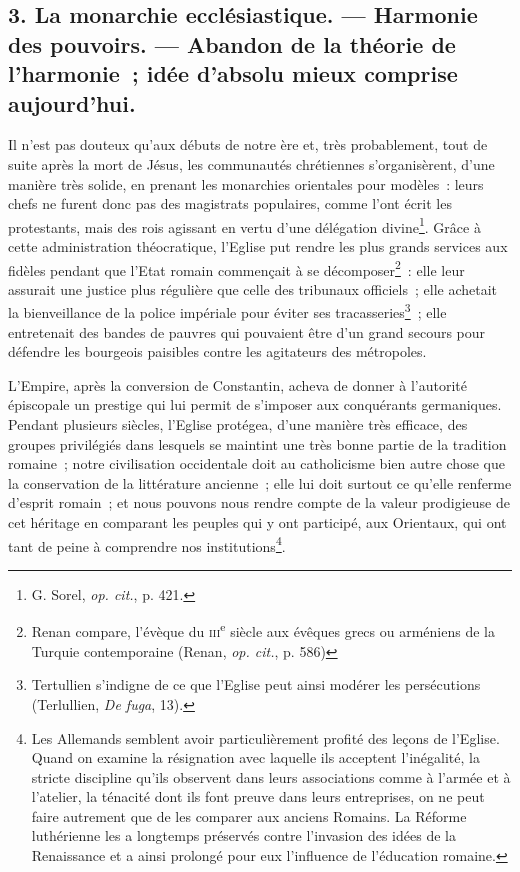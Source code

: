 \documentclass[french,twoside]{book} %
\begin{document}
\subsection[{3. La monarchie ecclésiastique. — Harmonie des pouvoirs. — Abandon de la théorie de l’harmonie ; idée d’absolu mieux comprise aujourd’hui.}]{3. La monarchie ecclésiastique. — Harmonie des pouvoirs. — Abandon de la théorie de l’harmonie ; idée d’absolu mieux comprise aujourd’hui.}
\label{p38}
\noindent Il n’est pas douteux qu’aux débuts de notre ère et, très probablement, tout de suite après la mort de Jésus, les communautés chrétiennes s’organisèrent, d’une manière très solide, en prenant les monarchies orientales pour modèles : leurs chefs ne furent donc pas des magistrats populaires, comme l’ont écrit les protestants, mais des rois agissant en vertu d’une délégation divine\footnote{ \noindent G. Sorel, \emph{op. cit.}, p. 421.
 }. Grâce à cette administration théocratique, l’Eglise put rendre les plus grands services aux fidèles pendant que l’Etat  romain commençait à se décomposer\footnote{ \noindent Renan compare, l’évèque du {\scshape iii}\textsuperscript{e} siècle aux évêques grecs ou arméniens de la Turquie contemporaine (Renan, \emph{op. cit.}, p. 586)
 } : elle leur assurait une justice plus régulière que celle des tribunaux officiels ; elle achetait la bienveillance de la police impériale pour éviter ses tracasseries\footnote{ \noindent Tertullien s’indigne de ce que l’Eglise peut ainsi modérer les persécutions (Terlullien, \emph{De fuga}, 13).
 } ; elle entretenait des bandes de pauvres qui pouvaient être d’un grand secours pour défendre les bourgeois paisibles contre les agitateurs des métropoles.\par
L’Empire, après la conversion de Constantin, acheva de donner à l’autorité épiscopale un prestige qui lui permit de s’imposer aux conquérants germaniques. Pendant plusieurs siècles, l’Eglise protégea, d’une manière très efficace, des groupes privilégiés dans lesquels se maintint une très bonne partie de la tradition romaine ; notre civilisation occidentale doit au catholicisme bien autre chose que la conservation de la littérature ancienne ; elle lui doit surtout ce qu’elle renferme d’esprit romain ; et nous pouvons nous rendre compte de la valeur prodigieuse de cet héritage en comparant les peuples qui y ont participé, aux Orientaux, qui ont tant de peine à comprendre nos institutions\footnote{ \noindent Les Allemands semblent avoir particulièrement profité des leçons de l’Eglise. Quand on examine la résignation avec laquelle ils acceptent l’inégalité, la stricte discipline qu’ils observent dans leurs associations comme à l’armée et à l’atelier, la ténacité dont ils font preuve dans leurs entreprises, on ne peut faire autrement que de les comparer aux anciens Romains. La Réforme luthérienne les a longtemps préservés contre l’invasion des idées de la Renaissance et a ainsi prolongé pour eux l’influence de l’éducation romaine.
 }.\par
\end{document}
